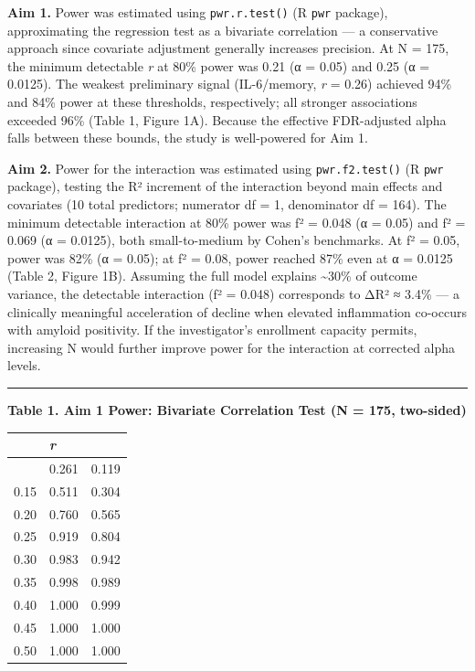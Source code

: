 \documentclass[
]{article}
\begin{document}
\textbf{Aim 1.} Power was estimated using \texttt{pwr.r.test()} (R
\texttt{pwr} package), approximating the regression test as a bivariate
correlation --- a conservative approach since covariate adjustment
generally increases precision. At N = 175, the minimum detectable
\textbar{}\emph{r}\textbar{} at 80\% power was 0.21 (α = 0.05) and 0.25
(α = 0.0125). The weakest preliminary signal (IL-6/memory,
\textbar{}\emph{r}\textbar{} = 0.26) achieved 94\% and 84\% power at
these thresholds, respectively; all stronger associations exceeded 96\%
(Table 1, Figure 1A). Because the effective FDR-adjusted alpha falls
between these bounds, the study is well-powered for Aim 1.

\textbf{Aim 2.} Power for the interaction was estimated using
\texttt{pwr.f2.test()} (R \texttt{pwr} package), testing the R²
increment of the interaction beyond main effects and covariates (10
total predictors; numerator df = 1, denominator df = 164). The minimum
detectable interaction at 80\% power was f² = 0.048 (α = 0.05) and f² =
0.069 (α = 0.0125), both small-to-medium by Cohen's benchmarks. At f² =
0.05, power was 82\% (α = 0.05); at f² = 0.08, power reached 87\% even
at α = 0.0125 (Table 2, Figure 1B). Assuming the full model explains
\textasciitilde30\% of outcome variance, the detectable interaction (f²
= 0.048) corresponds to ΔR² ≈ 3.4\% --- a clinically meaningful
acceleration of decline when elevated inflammation co-occurs with
amyloid positivity. If the investigator's enrollment capacity permits,
increasing N would further improve power for the interaction at
corrected alpha levels.

\begin{center}\rule{0.5\linewidth}{0.5pt}\end{center}

\textbf{Table 1. Aim 1 Power: Bivariate Correlation Test (N = 175,
two-sided)}

\begin{longtable}[]{@{}lll@{}}
\toprule\noalign{}
& \emph{r} & \\
\midrule\noalign{}
\endhead
\bottomrule\noalign{}
\endlastfoot
0.10 & 0.261 & 0.119 \\
0.15 & 0.511 & 0.304 \\
0.20 & 0.760 & 0.565 \\
0.25 & 0.919 & 0.804 \\
0.30 & 0.983 & 0.942 \\
0.35 & 0.998 & 0.989 \\
0.40 & 1.000 & 0.999 \\
0.45 & 1.000 & 1.000 \\
0.50 & 1.000 & 1.000 \\
\end{longtable}
\end{document}

